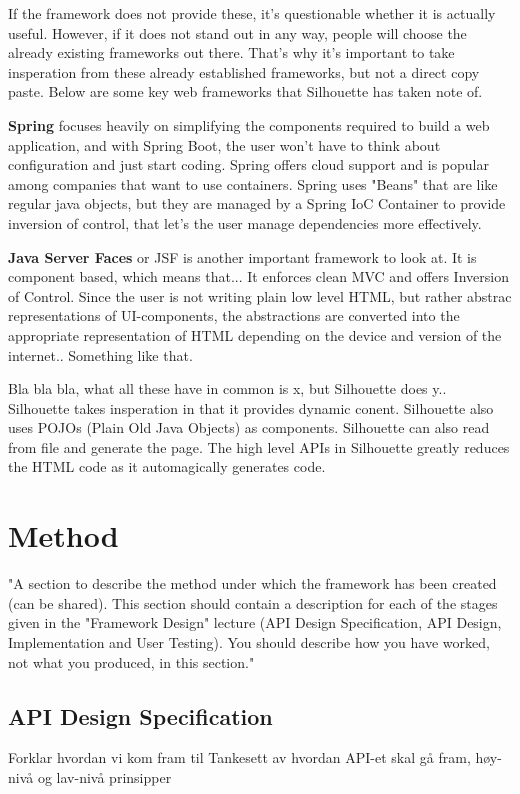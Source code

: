 \documentclass[12pt]{article}
\begin{document}
If the framework does not provide these, it's questionable whether it is actually useful. However, if it does not stand out in any way, people will choose the already existing frameworks out there. That's why it's important to take insperation from these already established frameworks, but not a direct copy paste. Below are some key web frameworks that Silhouette has taken note of.

\textbf{Spring} focuses heavily on simplifying the components required to build a web application, and with Spring Boot, the user won't have to think about configuration and just start coding. Spring offers cloud support and is popular among companies that want to use containers. Spring uses "Beans" that are like regular java objects, but they are managed by a Spring IoC Container to provide inversion of control, that let's the user manage dependencies more effectively.

\textbf{Java Server Faces} or JSF is another important framework to look at. It is component based, which means that... It enforces clean MVC and offers Inversion of Control. Since the user is not writing plain low level HTML, but rather abstrac representations of UI-components, the abstractions are converted into the appropriate representation of HTML depending on the device and version of the internet.. Something like that.

Bla bla bla, what all these have in common is x, but Silhouette does y..
Silhouette takes insperation in that it provides dynamic conent. Silhouette also uses POJOs (Plain Old Java Objects) as components. Silhouette can also read from file and generate the page. The high level APIs in Silhouette greatly reduces the HTML code as it automagically generates code.

\section{Method}
"A section to describe the method under which the framework has been created (can be shared). This section should contain a description for each of the stages given in the "Framework Design" lecture (API Design Specification, API Design, Implementation and User Testing). 
You should describe how you have worked, not what you produced, in this section."

    \subsection{API Design Specification}
    Forklar hvordan vi kom fram til Tankesett av hvordan API-et skal gå fram, høy-nivå og lav-nivå prinsipper
\end{document}
